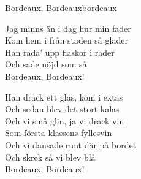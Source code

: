 \begin{song}{Bordeaux, Bordeaux}{bordeaux}
\begin{vers}
Jag minns än i dag hur min fader\\
Kom hem i från staden så glader\\
Han rada' upp flaskor i rader\\
Och sade nöjd som så\\
Bordeaux, Bordeaux!\\
\end{vers}
\begin{vers}
Han drack ett glas, kom i extas\\
Och sedan blev det stort kalas\\
Och vi små glin, ja vi drack vin\\
Som första klassens fyllesvin\\
Och vi dansade runt där på bordet\\
Och skrek så vi blev blå\\
Bordeaux, Bordeaux!\\
\end{vers}
\end{song}
